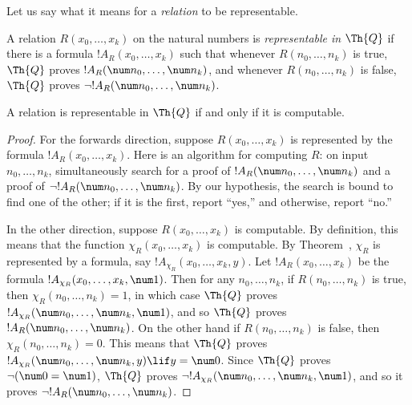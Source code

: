 \documentclass[../../include/open-logic-section]{subfiles}
\begin{document}
Let us say what it means for a \emph{relation} to be representable.

\begin{defn}
  A relation $R(x_0,\dots,x_k)$ on the natural numbers is {\em
    representable in $\Th{Q}$} if there is a formula
  $!A_R(x_0,\dots,x_k)$ such that whenever $R(n_0,\dots,n_k)$ is
  true, $\Th{Q}$ proves $!A_R(\num n_0,\dots,\num n_k)$, and whenever
  $R(n_0,\dots,n_k)$ is false, $\Th{Q}$ proves $\lnot !A_R(\num
  n_0,\dots,\num n_k)$.
\end{defn}

\begin{thm}
  A relation is representable in $\Th{Q}$ if and only if it is computable.
\end{thm}

\begin{proof}
For the forwards direction, suppose $R(x_0,\dots,x_k)$ is
represented by the formula $!A_R(x_0,\dots,x_k)$. Here is an
algorithm for computing $R$: on input $n_0,\dots,n_k$, simultaneously
search for a proof of $!A_R(\num n_0,\dots,\num n_k)$ and a proof of
$\lnot !A_R(\num n_0,\dots,\num n_k)$. By our hypothesis, the search
is bound to find one of the other; if it is the first, report ``yes,''
and otherwise, report ``no.''

In the other direction, suppose $R(x_0,\dots,x_k)$ is computable. By
definition, this means that the function $\chi_R(x_0,\dots,x_k)$ is
computable. By Theorem~, $\chi_R$ is
represented by a formula, say $!A_{\chi_R}(x_0,\dots,x_k,y)$. Let
$!A_R(x_0,\dots,x_k)$ be the formula $!A_{\chi_R}(x_0,\dots,x_k,\num
1)$. Then for any $n_0,\dots,n_k$, if $R(n_0,\dots,n_k)$ is true, then
$\chi_R(n_0,\dots,n_k) = 1$, in which case $\Th{Q}$ proves
$!A_{\chi_R}(\num n_0,\dots,\num n_k,\num 1)$, and so $\Th{Q}$ proves
$!A_R(\num n_0,\dots,\num n_k)$. On the other hand if
$R(n_0,\dots,n_k)$ is false, then $\chi_R(n_0,\dots,n_k) = 0$.  This
means that $\Th{Q}$ proves $!A_{\chi_R}(\num n_0,\dots,\num n_k,y)
\lif y = \num 0$. Since $\Th{Q}$ proves $\lnot (\num 0 = \num 1)$,
$\Th{Q}$ proves $\lnot !A_{\chi_R}(\num n_0,\dots,\num n_k,\num 1)$,
and so it proves $\lnot !A_R(\num n_0,\dots,\num n_k)$.
\end{proof}
\end{document}
